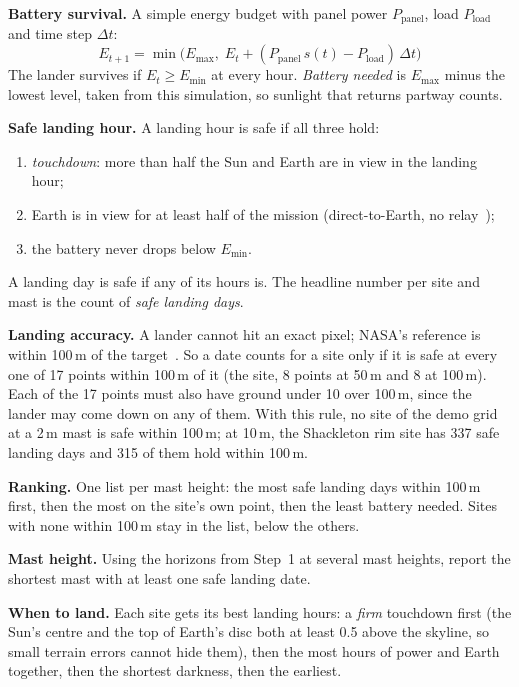\documentclass[11pt,a4paper]{article}
\begin{document}
\textbf{Battery survival.} A simple energy budget with panel power $P_\text{panel}$, load $P_\text{load}$ and time step $\Delta t$:
\begin{equation}
E_{t+1} = \min\!\big(E_{\max},\; E_t + (P_\text{panel}\, s(t) - P_\text{load})\,\Delta t\big)
\end{equation}
The lander survives if $E_t \ge E_{\min}$ at every hour. \emph{Battery needed} is $E_{\max}$ minus the lowest level, taken from this simulation, so sunlight that returns partway counts.

\textbf{Safe landing hour.} A landing hour is safe if all three hold:
\begin{enumerate}
  \item \emph{touchdown}: more than half the Sun and Earth are in view in the landing hour;
  \item Earth is in view for at least half of the mission (direct-to-Earth, no relay~\cite{nasa-artemis});
  \item the battery never drops below $E_{\min}$.
\end{enumerate}
A landing day is safe if any of its hours is. The headline number per site and mast is the count of \emph{safe landing days}.

\textbf{Landing accuracy.} A lander cannot hit an exact pixel; NASA's reference is within 100\,m of the target~\cite{nasa-artemis}. So a date counts for a site only if it is safe at every one of 17 points within 100\,m of it (the site, 8 points at 50\,m and 8 at 100\,m). Each of the 17 points must also have ground under 10\textdegree{} over 100\,m, since the lander may come down on any of them. With this rule, no site of the demo grid at a 2\,m mast is safe within 100\,m; at 10\,m, the Shackleton rim site has 337 safe landing days and 315 of them hold within 100\,m.

\textbf{Ranking.} One list per mast height: the most safe landing days within 100\,m first, then the most on the site's own point, then the least battery needed. Sites with none within 100\,m stay in the list, below the others.

\textbf{Mast height.} Using the horizons from Step~1 at several mast heights, report the shortest mast with at least one safe landing date.

\textbf{When to land.} Each site gets its best landing hours: a \emph{firm} touchdown first (the Sun's centre and the top of Earth's disc both at least 0.5\textdegree{} above the skyline, so small terrain errors cannot hide them), then the most hours of power and Earth together, then the shortest darkness, then the earliest.
\end{document}
